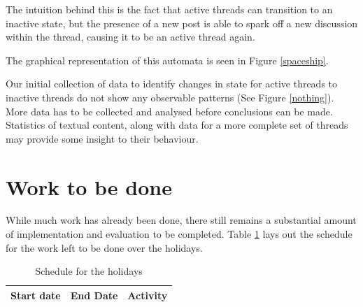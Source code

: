 \documentclass[12 pt]{article}
\begin{document}
The intuition behind this is the fact that active threads can transition to an inactive state, but the presence of a new post is able to spark off a new discussion within the thread, causing it to be an active thread again.

The graphical representation of this automata is seen in Figure \ref{spaceship}.


Our initial collection of data to identify changes in state for active threads to inactive threads do not show any observable patterns (See Figure \ref{nothing}). More data has to be collected and analysed before conclusions can be made. Statistics of textual content, along with data for a more complete set of threads may provide some insight to their behaviour.

\section{Work to be done}
While much work has already been done, there still remains a substantial amount of implementation and evaluation to be completed. Table \ref{schedule} lays out the schedule for the work left to be done over the holidays.
\begin{table}\label{schedule}
\singlespacing
\begin{tabular}{| l | l | c |}
	\hline
	Start date & End Date & Activity \\
	\hline
	
	\hline
\end{tabular}
\caption{Schedule for the holidays}
\end{table}




\end{document}
